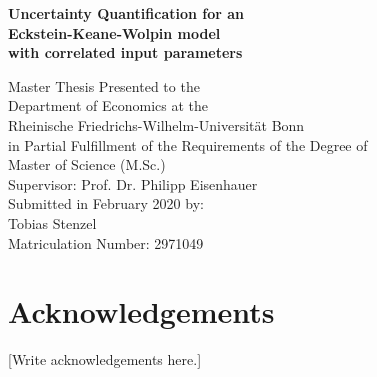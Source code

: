 \begin{titlepage}
	
\begin{center}
	
\vspace*{1.0cm}

{\LARGE
\bfseries Uncertainty Quantification for an \\
\vspace*{0.5cm}
Eckstein-Keane-Wolpin model
}
\\
\vspace*{0.5cm}
{\LARGE
\bfseries with correlated input parameters
}

{\large
\vspace*{4.0cm}
Master Thesis Presented to the\\
\vspace*{0.25cm}
Department of Economics at the\\
\vspace*{0.25cm}
Rheinische Friedrichs-Wilhelm-Universität Bonn\\

\vspace*{2.0cm}
in Partial Fulfillment of the Requirements of the Degree of\\
\vspace*{0.25cm}
Master of Science (M.Sc.)\\

\vspace*{4.0cm}
Supervisor: Prof. Dr. Philipp Eisenhauer\\

\vspace*{2.0cm}
Submitted in February 2020 by:\\
Tobias Stenzel\\
Matriculation Number: 2971049
}

\end{center}

\end{titlepage}

\newpage
\section*{Acknowledgements}
[Write acknowledgements here.]


\newpage